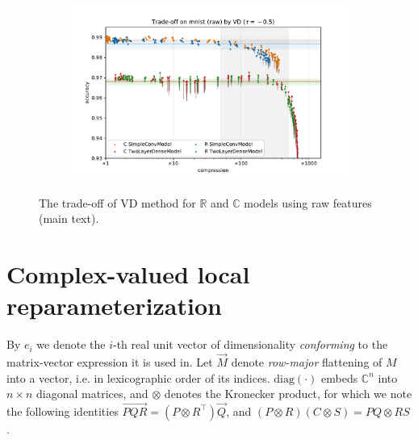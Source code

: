 \documentclass[a4paper,10pt,onecolumn]{article}
\newcommand{\real}{\mathbb{R}}
\newcommand{\cplx}{\mathbb{C}}
\renewcommand{\vec}[1]{\overrightarrow{#1}}
\newcommand{\diag}[1]{\mathrm{diag}{#1}}
\begin{document}
\begin{figure}[b]
\begin{subfigure}[b]{0.5\columnwidth}
  \end{subfigure}%
  \begin{subfigure}[b]{0.5\columnwidth}
    \centering
    \includegraphics[width=\linewidth]{figure__mnist-like__trade-off/legacy__VD__mnist__raw__-0.5.pdf}
  \end{subfigure}
  \caption{%
    The trade-off of VD method for $\real$ and $\cplx$ models using raw features (main text).
  }
  \label{fig:paper__mnist-like__trade-off__VD__raw}
\end{figure}



\section{Complex-valued local reparameterization} %
\label{sec:complex_valued_local_reparameterization}

By $e_i$ we denote the $i$-th real unit vector of dimensionality \textit{conforming} to the
matrix-vector expression it is used in. Let $\vec{M}$ denote \textit{row-major} flattening
of $M$ into a vector, i.e. in lexicographic order of its indices. $\diag{(\cdot)}$ embeds
$\cplx^n$ into $n\times n$ diagonal matrices, and $\otimes$ denotes the Kronecker product,
for which we note the following identities $
  \vec{P Q R} = (P \otimes R^\top) \vec{Q}
$, and $
  (P \otimes R) (C \otimes S) = P Q \otimes R S
$ \citep{petersen_matrix_2012}.
\end{document}

